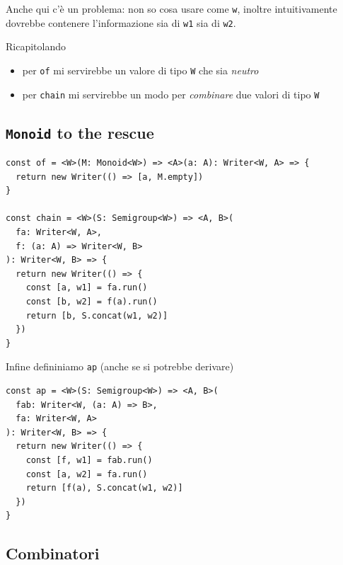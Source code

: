\documentclass[12pt]{article}
\begin{document}
Anche qui c'è un problema: non so cosa usare come \texttt{w}, inoltre intuitivamente dovrebbe contenere l'informazione sia di \texttt{w1} sia
di \texttt{w2}.

Ricapitolando

\begin{itemize}
\item per \texttt{of} mi servirebbe un valore di tipo \texttt{W} che sia \emph{neutro}
\item per \texttt{chain} mi servirebbe un modo per \emph{combinare} due valori di tipo \texttt{W}
\end{itemize}

\subsection{\texttt{Monoid} to the rescue}

\begin{verbatim}
const of = <W>(M: Monoid<W>) => <A>(a: A): Writer<W, A> => {
  return new Writer(() => [a, M.empty])
}

const chain = <W>(S: Semigroup<W>) => <A, B>(
  fa: Writer<W, A>,
  f: (a: A) => Writer<W, B>
): Writer<W, B> => {
  return new Writer(() => {
    const [a, w1] = fa.run()
    const [b, w2] = f(a).run()
    return [b, S.concat(w1, w2)]
  })
}
\end{verbatim}

Infine defininiamo \texttt{ap} (anche se si potrebbe derivare)

\begin{verbatim}
const ap = <W>(S: Semigroup<W>) => <A, B>(
  fab: Writer<W, (a: A) => B>,
  fa: Writer<W, A>
): Writer<W, B> => {
  return new Writer(() => {
    const [f, w1] = fab.run()
    const [a, w2] = fa.run()
    return [f(a), S.concat(w1, w2)]
  })
}
\end{verbatim}

\subsection{Combinatori}
\end{document}
